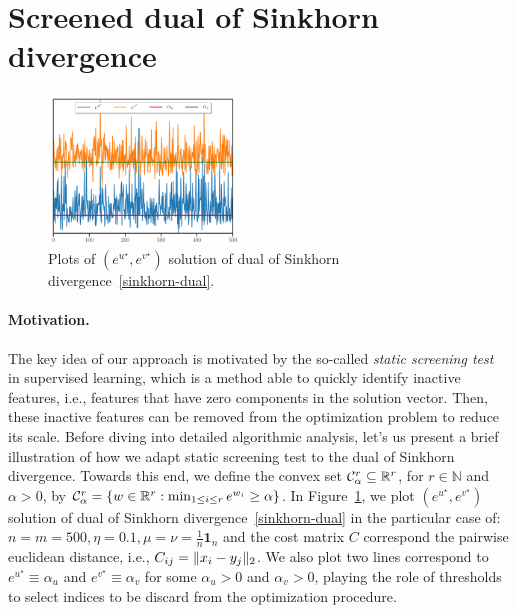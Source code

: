 
\section{Screened dual of Sinkhorn divergence} %
\label{sec:screened_dual_of_sinkhorn_divergence}

\begin{figure}
\vspace{-15pt}
\centering
\includegraphics[width=0.45\textwidth]{./figs/motivations.pdf}
\caption{Plots of $(e^{u^\star}, e^{v^\star})$ solution of dual of Sinkhorn divergence~\ref{sinkhorn-dual}.}
\label{fig:motivations}
\vspace{-11pt}
\end{figure}

\paragraph{Motivation.} 

The key idea of our approach is motivated by the so-called \emph{static screening test}~\cite{Ghaoui2010SafeFE} in supervised learning, which is a method able to quickly identify inactive features, i.e., features that have zero components in the solution vector. 
Then, these inactive features can be removed from the optimization problem to reduce its scale.
Before diving into detailed algorithmic analysis, let's us present a brief illustration of how we adapt static screening test to the dual of Sinkhorn divergence.
Towards this end, we define the convex set $\mathcal{C}^r_{\alpha} \subseteq {\mathbb{R}}^r$, for $r\in \mathbb N$ and $\alpha >0$, by $\mathcal{C}^r_{\alpha} = \{w \in {\mathbb{R}}^{r}: \min_{1\leq i\leq r} e^{w_i} \geq \alpha\}$.
In Figure~\ref{fig:motivations}, we plot $(e^{u^\star}, e^{v^\star})$ solution of dual of Sinkhorn divergence~\ref{sinkhorn-dual} in the particular case of: $n=m=500, \eta=0.1, \mu = \nu = \frac 1n \mathbf 1_n$ and the cost matrix $C$ correspond the pairwise euclidean distance, i.e., $C_{ij} = \|x_i - y_j\|_2$. 
We also plot two lines correspond to $e^{u^\star} \equiv \alpha_u$ and $e^{v^\star} \equiv \alpha_v$ for some $\alpha_u>0$ and $\alpha_v >0$, playing the role of thresholds to select indices to be discard from the optimization procedure.

